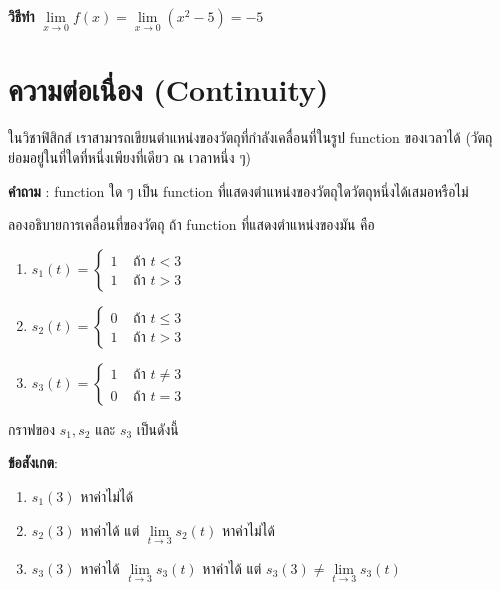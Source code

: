 \documentclass[
]{book}
\begin{document}
\textbf{วิธีทำ}
\(\underset{x\rightarrow 0}{\lim}f(x)=\underset{x\rightarrow 0}{\lim}(x^{2}-5)=-5\)

\section{ความต่อเนื่อง
(Continuity)}\label{uxe04uxe27uxe32uxe21uxe15uxe2duxe40uxe19uxe2duxe07-continuity}

ในวิชาฟิสิกส์ เราสามารถเขียนตำแหน่งของวัตถุที่กำลังเคลื่อนที่ในรูป function ของเวลาได้
(วัตถุย่อมอยู่ในที่ใดที่หนึ่งเพียงที่เดียว ณ เวลาหนึ่ง ๆ)

\textbf{คำถาม} : function ใด ๆ เป็น function
ที่แสดงตำแหน่งของวัตถุใดวัตถุหนึ่งได้เสมอหรือไม่

ลองอธิบายการเคลื่อนที่ของวัตถุ ถ้า function ที่แสดงตำแหน่งของมัน คือ

\begin{enumerate}
\def\labelenumi{\arabic{enumi}.}
\item
  \(s_{1}(t)  = \begin{cases}
              1 & \text{ ถ้า } t<3 \\
              1  & \text{ ถ้า } t>3
                \end{cases}\)
\item
  \(s_{2}(t)  = \begin{cases}
              0 & \text{ ถ้า } t \le 3 \\
              1  & \text{ ถ้า } t>3
                \end{cases}\)
\item
  \(s_{3}(t)  = \begin{cases}
              1 & \text{ ถ้า } t \neq 3 \\
              0  & \text{ ถ้า } t=3
                \end{cases}\)
\end{enumerate}

กราฟของ \(s_1,s_2\) และ \(s_3\) เป็นดังนี้

\textbf{ข้อสังเกต}:

\begin{enumerate}
\def\labelenumi{\arabic{enumi}.}
\item
  \(s_1(3)\) หาค่าไม่ได้
\item
  \(s_2(3)\) หาค่าได้ แต่ \(\underset{t \rightarrow 3}{\lim} s_2(t)\)
  หาค่าไม่ได้
\item
  \(s_3(3)\) หาค่าได้ \(\underset{t \rightarrow 3}{\lim} s_3(t)\) หาค่าได้
  แต่ \(s_3(3) \neq \underset{t \rightarrow 3}{\lim} s_3(t)\)
\end{enumerate}
\end{document}
